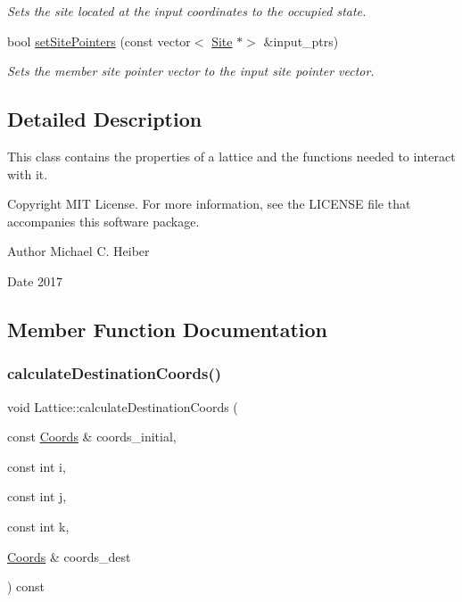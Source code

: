 \begin{DoxyCompactItemize}
\begin{DoxyCompactList}\small\item\em Sets the site located at the input coordinates to the occupied state. \end{DoxyCompactList}\item 
bool \hyperlink{class_lattice_aaa16f46daaf157c155f0e9b378a07b5d}{set\+Site\+Pointers} (const vector$<$ \hyperlink{class_site}{Site} $\ast$$>$ \&input\+\_\+ptrs)
\begin{DoxyCompactList}\small\item\em Sets the member site pointer vector to the input site pointer vector. \end{DoxyCompactList}\end{DoxyCompactItemize}


\subsection{Detailed Description}
This class contains the properties of a lattice and the functions needed to interact with it. 

\begin{DoxyCopyright}{Copyright}
M\+IT License. For more information, see the L\+I\+C\+E\+N\+SE file that accompanies this software package. 
\end{DoxyCopyright}
\begin{DoxyAuthor}{Author}
Michael C. Heiber 
\end{DoxyAuthor}
\begin{DoxyDate}{Date}
2017 
\end{DoxyDate}


\subsection{Member Function Documentation}
\mbox{\label{class_lattice_aa6b80d6264bfc23ae5fea39abd2557d5}} 
\subsubsection{\texorpdfstring{calculate\+Destination\+Coords()}{calculateDestinationCoords()}}
{\footnotesize\ttfamily void Lattice\+::calculate\+Destination\+Coords (\begin{DoxyParamCaption}\item[{const \hyperlink{struct_coords}{Coords} \&}]{coords\+\_\+initial,  }\item[{const int}]{i,  }\item[{const int}]{j,  }\item[{const int}]{k,  }\item[{\hyperlink{struct_coords}{Coords} \&}]{coords\+\_\+dest }\end{DoxyParamCaption}) const}



